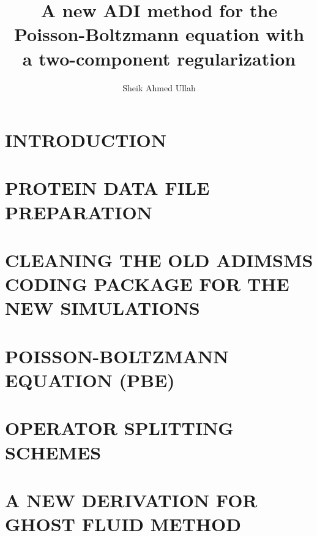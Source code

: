 \documentclass[dissertation]{uathesis}
\author{Sheik Ahmed Ullah}       %
\title{A new ADI method for the Poisson-Boltzmann equation with \protect\\ a two-component regularization}
\begin{document}
\makefrontmatter


\begin{body}

\chapter{INTRODUCTION}
\label{chap: introduction}

\chapter{PROTEIN DATA FILE PREPARATION}
\label{chap: protein_data}
 

\chapter{CLEANING THE OLD ADIMSMS CODING PACKAGE FOR THE NEW SIMULATIONS}
\label{chap: cleaning}
 
\chapter{POISSON-BOLTZMANN EQUATION (PBE)}
\label{chap: PBE}


\chapter{OPERATOR SPLITTING SCHEMES}
\label{chap:opt_split}

\chapter{A NEW DERIVATION FOR GHOST FLUID METHOD}
\label{chap:new_GFM}



\end{body}
\end{document}
